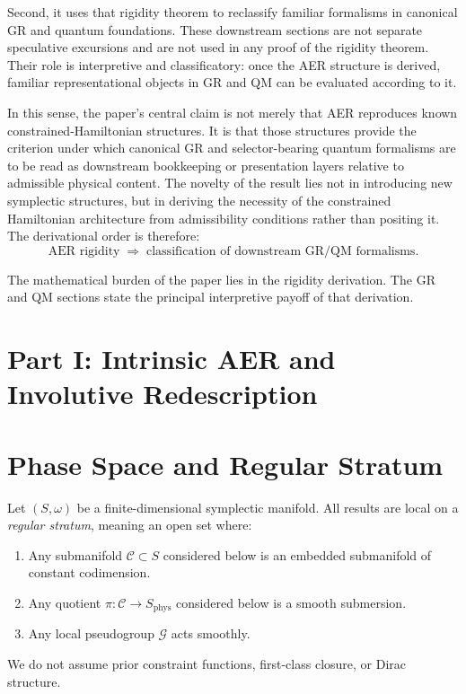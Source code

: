 \documentclass[11pt]{article}
\theoremstyle{remark}
\theoremstyle{plain}
\begin{document}
Second, it uses that rigidity theorem to reclassify familiar formalisms in canonical GR and quantum foundations. These downstream sections are not separate speculative excursions and are not used in any proof of the rigidity theorem. Their role is interpretive and classificatory: once the AER structure is derived, familiar representational objects in GR and QM can be evaluated according to it.

In this sense, the paper's central claim is not merely that AER reproduces known constrained-Hamiltonian structures. It is that those structures provide the criterion under which canonical GR and selector-bearing quantum formalisms are to be read as downstream bookkeeping or presentation layers relative to admissible physical content. The novelty of the result lies not in introducing new symplectic structures, but in deriving the necessity of the constrained Hamiltonian architecture from admissibility conditions rather than positing it. The derivational order is therefore:
\[
\text{AER rigidity} \;\Longrightarrow\; \text{classification of downstream GR/QM formalisms}.
\]

The mathematical burden of the paper lies in the rigidity derivation. The GR and QM sections state the principal interpretive payoff of that derivation.

\section*{Part I: Intrinsic AER and Involutive Redescription}

\section{Phase Space and Regular Stratum}

Let $(S,\omega)$ be a finite-dimensional symplectic manifold.
All results are local on a \emph{regular stratum}, meaning an open set where:

\begin{enumerate}
\item Any submanifold $\mathcal{C}\subset S$ considered below is an embedded submanifold of constant codimension.
\item Any quotient $\pi:\mathcal{C}\to S_{\mathrm{phys}}$ considered below is a smooth submersion.
\item Any local pseudogroup $\mathcal{G}$ acts smoothly.
\end{enumerate}

We do not assume prior constraint functions, first-class closure, or Dirac structure.
\end{document}
